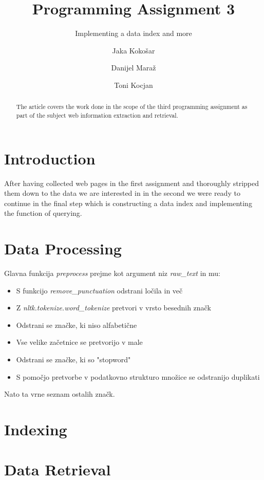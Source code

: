 \documentclass[runningheads]{llncs}
\begin{document}
\title{Programming Assignment 3}
\subtitle{Implementing a data index and more}

\author{
  Jaka Kokošar
  \and
  Danijel Maraž
  \and
  Toni Kocjan
}


\maketitle             

\begin{abstract}
The article covers the work done in the scope of the third programming assignment as part of the subject web information extraction and retrieval. 

\end{abstract}

\section{Introduction}
After having collected web pages in the first assignment and thoroughly stripped them down to the data we are interested in in the second we were ready to continue in the final step which is constructing a data index and implementing the function of querying.

\section{Data Processing}
Glavna funkcija \textit{preprocess} prejme kot argument niz \textit{raw\_text} in mu:
\begin{itemize}
\item S funkcijo \textit{remove\_punctuation} odstrani ločila in več
\item Z \textit{nltk.tokenize.word\_tokenize} pretvori v vrsto besednih značk
\item Odstrani se značke, ki niso alfabetične
\item Vse velike začetnice se pretvorijo v male
\item Odstrani se značke, ki so "stopword"
\item S pomočjo pretvorbe v podatkovno strukturo množice se odstranijo duplikati
\end{itemize} 
Nato ta vrne seznam ostalih značk.

\section{Indexing}

\section{Data Retrieval}
\end{document}
